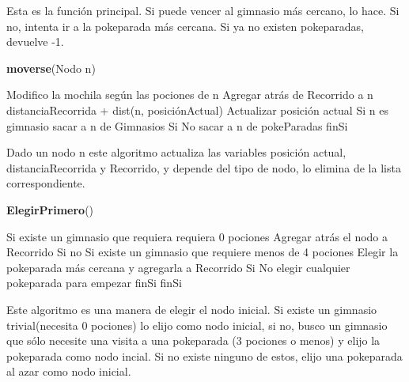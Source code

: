 \documentclass[spanish,12pt]{article}
\begin{document}
Esta es la función principal. Si puede vencer al gimnasio más cercano, lo hace. Si no, intenta ir a la pokeparada más cercana. Si ya no existen pokeparadas, devuelve -1.

\begin{algorithm}[H]{\textbf{moverse}(Nodo n)}
	\begin{algorithmic}[1]
		\State Modifico la mochila según las pociones de n
		\State Agregar atrás de Recorrido a n
		\State distanciaRecorrida + dist(n, posiciónActual)
		\State Actualizar posición actual
		\State Si n es gimnasio
		\State \quad sacar a n de Gimnasios
		\State Si No
		\State \quad sacar a n de pokeParadas
		\State finSi
	\end{algorithmic}
\end{algorithm}

Dado un nodo n este algoritmo actualiza las variables posición actual, distanciaRecorrida y Recorrido, y depende del tipo de nodo, lo elimina de la lista correspondiente.

\begin{algorithm}[H]{\textbf{ElegirPrimero}()}
	\begin{algorithmic}[1]
	\State Si existe un gimnasio que requiera requiera 0 pociones 
	\State \quad Agregar atrás el nodo a Recorrido
	\State Si no
	\State \quad Si existe un gimnasio que requiere menos de 4 pociones
	\State \qquad Elegir la pokeparada más cercana y agregarla a Recorrido
	\State \quad Si No 
	\State \qquad elegir cualquier pokeparada para empezar
	\State \quad finSi
	\State finSi
	\end{algorithmic}
\end{algorithm}

Este algoritmo es una manera de elegir el nodo inicial. Si existe un gimnasio trivial(necesita 0 pociones) lo elijo como nodo inicial, si no, busco un gimnasio que sólo necesite una visita a una pokeparada (3 pociones o menos) y elijo la pokeparada como nodo incial. Si no existe ninguno de estos, elijo una pokeparada al azar como nodo inicial.
\end{document}
